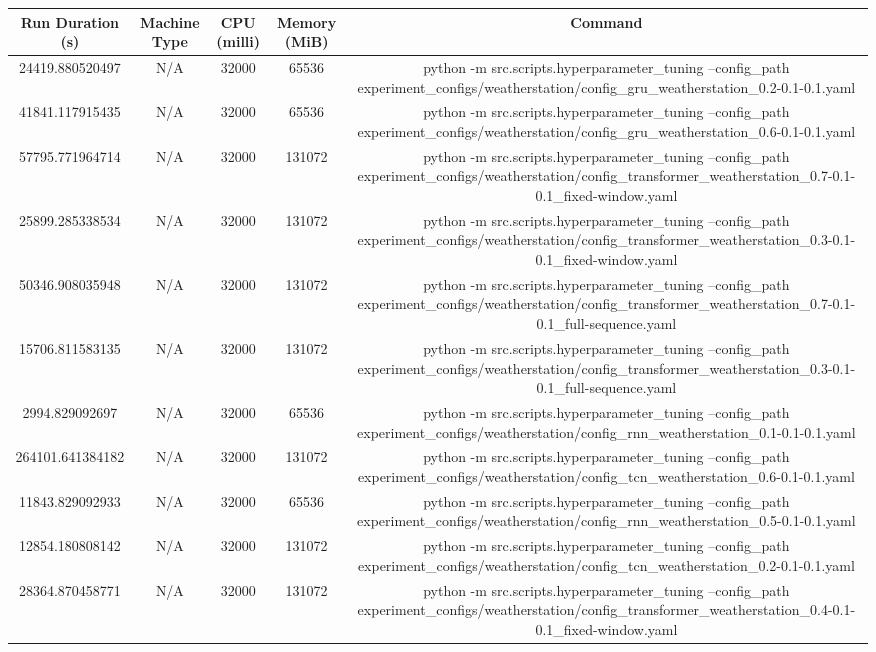 \begin{table}[h]
\centering
\begin{tabular}{c | c | c | c | c}
\hline
Run Duration (s) & Machine Type & CPU (milli) & Memory (MiB) & Command \\
\hline
24419.880520497 & N/A & 32000 & 65536 & python -m src.scripts.hyperparameter_tuning --config_path experiment_configs/weatherstation/config_gru_weatherstation_0.2-0.1-0.1.yaml \\
41841.117915435 & N/A & 32000 & 65536 & python -m src.scripts.hyperparameter_tuning --config_path experiment_configs/weatherstation/config_gru_weatherstation_0.6-0.1-0.1.yaml \\
57795.771964714 & N/A & 32000 & 131072 & python -m src.scripts.hyperparameter_tuning --config_path experiment_configs/weatherstation/config_transformer_weatherstation_0.7-0.1-0.1_fixed-window.yaml \\
25899.285338534 & N/A & 32000 & 131072 & python -m src.scripts.hyperparameter_tuning --config_path experiment_configs/weatherstation/config_transformer_weatherstation_0.3-0.1-0.1_fixed-window.yaml \\
50346.908035948 & N/A & 32000 & 131072 & python -m src.scripts.hyperparameter_tuning --config_path experiment_configs/weatherstation/config_transformer_weatherstation_0.7-0.1-0.1_full-sequence.yaml \\
15706.811583135 & N/A & 32000 & 131072 & python -m src.scripts.hyperparameter_tuning --config_path experiment_configs/weatherstation/config_transformer_weatherstation_0.3-0.1-0.1_full-sequence.yaml \\
2994.829092697 & N/A & 32000 & 65536 & python -m src.scripts.hyperparameter_tuning --config_path experiment_configs/weatherstation/config_rnn_weatherstation_0.1-0.1-0.1.yaml \\
264101.641384182 & N/A & 32000 & 131072 & python -m src.scripts.hyperparameter_tuning --config_path experiment_configs/weatherstation/config_tcn_weatherstation_0.6-0.1-0.1.yaml \\
11843.829092933 & N/A & 32000 & 65536 & python -m src.scripts.hyperparameter_tuning --config_path experiment_configs/weatherstation/config_rnn_weatherstation_0.5-0.1-0.1.yaml \\
12854.180808142 & N/A & 32000 & 131072 & python -m src.scripts.hyperparameter_tuning --config_path experiment_configs/weatherstation/config_tcn_weatherstation_0.2-0.1-0.1.yaml \\
28364.870458771 & N/A & 32000 & 131072 & python -m src.scripts.hyperparameter_tuning --config_path experiment_configs/weatherstation/config_transformer_weatherstation_0.4-0.1-0.1_fixed-window.yaml \\

\end{tabular}
\end{table}
